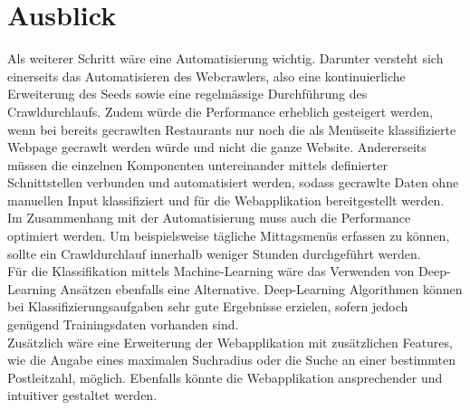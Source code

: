 \section{Ausblick}
Als weiterer Schritt wäre eine Automatisierung wichtig.
Darunter versteht sich einerseits das Automatisieren des Webcrawlers, also eine kontinuierliche Erweiterung des Seeds sowie eine regelmässige Durchführung des Crawldurchlaufs.
Zudem würde die Performance erheblich gesteigert werden, wenn bei bereits gecrawlten Restaurants nur noch die als Menüseite klassifizierte Webpage gecrawlt werden würde und nicht die ganze Website.
Andererseits müssen die einzelnen Komponenten untereinander mittels definierter Schnittstellen verbunden und automatisiert werden, sodass gecrawlte Daten ohne manuellen Input klassifiziert und für die Webapplikation bereitgestellt werden.\\
Im Zusammenhang mit der Automatisierung muss auch die Performance optimiert werden.
Um beispielsweise tägliche Mittagsmenüs erfassen zu können, sollte ein Crawldurchlauf innerhalb weniger Stunden durchgeführt werden.\\
Für die Klassifikation mittels Machine-Learning wäre das Verwenden von Deep-Learning Ansätzen ebenfalls eine Alternative.
Deep-Learning Algorithmen können bei Klassifizierungsaufgaben sehr gute Ergebnisse erzielen, sofern jedoch genügend Trainingsdaten vorhanden sind.\\
Zusätzlich wäre eine Erweiterung der Webapplikation mit zusätzlichen Features, wie die Angabe eines maximalen Suchradius oder die Suche an einer bestimmten Postleitzahl, möglich.
Ebenfalls könnte die Webapplikation ansprechender und intuitiver gestaltet werden.


